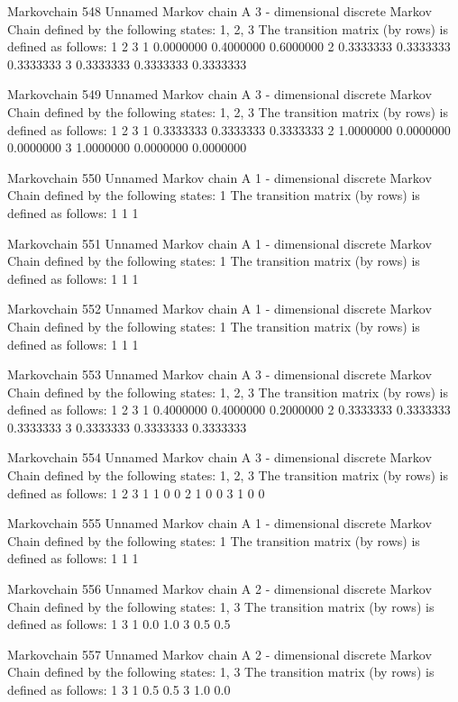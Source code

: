 \documentclass[
  nojss]{jss}
\begin{document}
\begin{CodeChunk}
\begin{CodeOutput}
Markovchain  548 
Unnamed Markov chain 
 A  3 - dimensional discrete Markov Chain defined by the following states: 
 1, 2, 3 
 The transition matrix  (by rows)  is defined as follows: 
          1         2         3
1 0.0000000 0.4000000 0.6000000
2 0.3333333 0.3333333 0.3333333
3 0.3333333 0.3333333 0.3333333

Markovchain  549 
Unnamed Markov chain 
 A  3 - dimensional discrete Markov Chain defined by the following states: 
 1, 2, 3 
 The transition matrix  (by rows)  is defined as follows: 
          1         2         3
1 0.3333333 0.3333333 0.3333333
2 1.0000000 0.0000000 0.0000000
3 1.0000000 0.0000000 0.0000000

Markovchain  550 
Unnamed Markov chain 
 A  1 - dimensional discrete Markov Chain defined by the following states: 
 1 
 The transition matrix  (by rows)  is defined as follows: 
  1
1 1

Markovchain  551 
Unnamed Markov chain 
 A  1 - dimensional discrete Markov Chain defined by the following states: 
 1 
 The transition matrix  (by rows)  is defined as follows: 
  1
1 1

Markovchain  552 
Unnamed Markov chain 
 A  1 - dimensional discrete Markov Chain defined by the following states: 
 1 
 The transition matrix  (by rows)  is defined as follows: 
  1
1 1

Markovchain  553 
Unnamed Markov chain 
 A  3 - dimensional discrete Markov Chain defined by the following states: 
 1, 2, 3 
 The transition matrix  (by rows)  is defined as follows: 
          1         2         3
1 0.4000000 0.4000000 0.2000000
2 0.3333333 0.3333333 0.3333333
3 0.3333333 0.3333333 0.3333333

Markovchain  554 
Unnamed Markov chain 
 A  3 - dimensional discrete Markov Chain defined by the following states: 
 1, 2, 3 
 The transition matrix  (by rows)  is defined as follows: 
  1 2 3
1 1 0 0
2 1 0 0
3 1 0 0

Markovchain  555 
Unnamed Markov chain 
 A  1 - dimensional discrete Markov Chain defined by the following states: 
 1 
 The transition matrix  (by rows)  is defined as follows: 
  1
1 1

Markovchain  556 
Unnamed Markov chain 
 A  2 - dimensional discrete Markov Chain defined by the following states: 
 1, 3 
 The transition matrix  (by rows)  is defined as follows: 
    1   3
1 0.0 1.0
3 0.5 0.5

Markovchain  557 
Unnamed Markov chain 
 A  2 - dimensional discrete Markov Chain defined by the following states: 
 1, 3 
 The transition matrix  (by rows)  is defined as follows: 
    1   3
1 0.5 0.5
3 1.0 0.0


\end{CodeOutput}
\end{CodeChunk}
\end{document}
